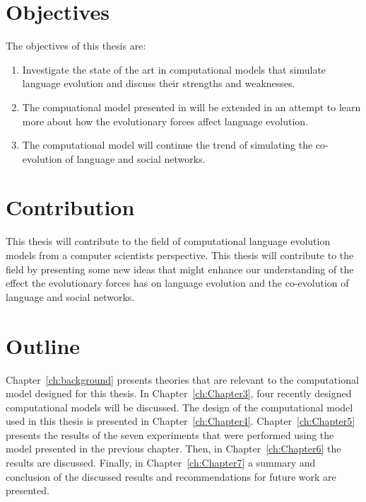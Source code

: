 \section{Objectives}
The objectives of this thesis are:

\begin{centering}
    \begin{enumerate}
        \item Investigate the state of the art in computational models that simulate language evolution and discuss their strengths and weaknesses.
        \item The compuational model presented in \citet{lekvam2014co} will be extended in an attempt to learn more about how the evolutionary forces affect language evolution.
        \item The computational model will continue the trend of simulating the co-evolution of language and social networks.  
    \end{enumerate}
\end{centering}

\section{Contribution}
This thesis will contribute to the field of computational language evolution models from a computer scientists perspective. This thesis will contribute to the field by presenting some new ideas that might enhance our understanding of the effect the evolutionary forces has on language evolution and the co-evolution of language and social networks.

\section{Outline}
Chapter~\ref{ch:background} presents theories that are relevant to the computational model designed for this thesis. In Chapter~\ref{ch:Chapter3}, four recently designed computational models will be discussed. The design of the computational model used in this thesis is presented in Chapter~\ref{ch:Chapter4}. Chapter~\ref{ch:Chapter5} presents the results of the seven experiments that were performed using the model presented in the previous chapter. Then, in Chapter~\ref{ch:Chapter6} the results are discussed. Finally, in Chapter~\ref{ch:Chapter7} a summary and conclusion of the discussed results and recommendations for future work are presented.      


